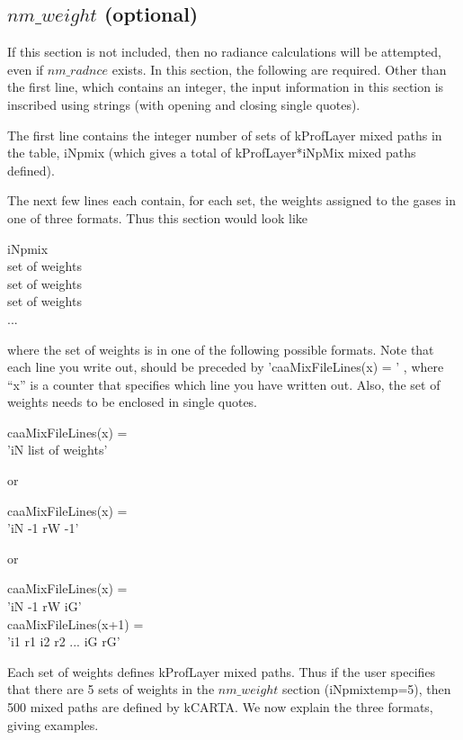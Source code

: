 \documentclass[12pt]{article}
\newcommand{\kc}{\textsf{kCARTA}\xspace}
\newcommand{\ttab}{\indent\indent}
\begin{document}
{\subsection{$nm\_weight$ (optional)}

If this section is not included, then no radiance calculations will
be attempted, even if $nm\_radnce$ exists.  In this section, the
following are required.  Other than the first line, which contains an integer,
the input information in this section is inscribed using strings (with opening
and closing single quotes). 

The first line contains the integer number of sets of kProfLayer
mixed paths in the table, iNpmix (which gives a total of {\sf
kProfLayer*iNpMix} mixed paths defined).  

The next few lines each contain, for each set, the weights assigned to the
gases in one of three formats.  Thus this section would look like

\medskip
{\sf 
\ttab iNpmix\\
\ttab 1  set of weights \\
\ttab 2  set of weights \\
\ttab 3  set of weights \\
\ttab ...\\}

\medskip
\noindent
where the set of weights is in one of the following possible
formats. Note that each line you write out, should be preceded by 
'caaMixFileLines(x) = ' , where ``x'' is a counter that specifies which
line you have written out. Also, the set of weights needs to be
enclosed in single quotes.

\medskip
{\sf
\ttab caaMixFileLines(x) = \\
\ttab \indent 'iN list of weights' }

\smallskip\noindent or

{\sf
\ttab  caaMixFileLines(x) = \\
\ttab \indent 'iN -1 rW -1'}

\smallskip\noindent or

{\sf
\ttab caaMixFileLines(x) =    \\
\ttab \indent 'iN -1 rW iG' \\
\ttab caaMixFileLines(x+1) =  \\
\ttab \indent  'i1 r1 i2 r2  ... iG rG'}

\medskip
Each set of weights defines kProfLayer mixed paths.  Thus if the
user specifies that there are 5 sets of weights in the $nm\_weight$ section
(iNpmixtemp=5), then 500 mixed paths are defined by \kc.  We now
explain the three formats, giving examples.

}
\end{document}

